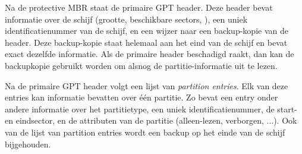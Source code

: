 Na de protective MBR staat de primaire GPT header. Deze header bevat informatie over de schijf (grootte, beschikbare sectors, ), een uniek identificatienummer van de schijf, en een wijzer naar een backup-kopie van de header. Deze backup-kopie staat helemaal aan het eind van de schijf en bevat exact dezelfde informatie. Als de primaire header beschadigd raakt, dan kan de backupkopie gebruikt worden om alsnog de partitie-informatie uit te lezen.

Na de primaire GPT header volgt een lijst van \emph{partition entries}. Elk van deze entries kan informatie bevatten over \'e\'en partitie. Zo bevat een entry onder andere informatie over het partitietype, een uniek identificatienummer, de start- en eindsector, en de attributen van de partitie (alleen-lezen, verborgen, ...). Ook van de lijst van partition entries wordt een backup op het einde van de schijf bijgehouden.








